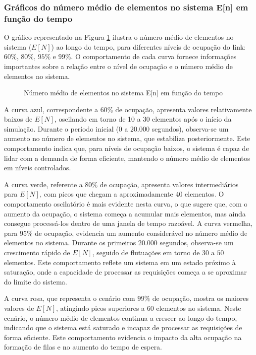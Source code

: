 \subsubsection{Gráficos do número médio de elementos no sistema E[n] em função do tempo}
O gráfico representado na Figura \ref{fig:eNE2} ilustra o número médio de elementos no sistema (\(E[N]\)) ao longo do tempo, para diferentes níveis de ocupação do link: \(60\%\), \(80\%\), \(95\%\) e \(99\%\). O comportamento de cada curva fornece informações importantes sobre a relação entre o nível de ocupação e o número médio de elementos no sistema.

\begin{figure}[h!]
   \centering
   
   \caption{Número médio de elementos no sistema E[n] em função do tempo}
   \label{fig:eNE2}
\end{figure}
A curva azul, correspondente a \(60\%\) de ocupação, apresenta valores relativamente baixos de \(E[N]\), oscilando em torno de 10 a 30 elementos após o início da simulação. Durante o período inicial (\(0\) a \(20.000\) segundos), observa-se um aumento no número de elementos no sistema, que estabiliza posteriormente. Este comportamento indica que, para níveis de ocupação baixos, o sistema é capaz de lidar com a demanda de forma eficiente, mantendo o número médio de elementos em níveis controlados.

A curva verde, referente a \(80\%\) de ocupação, apresenta valores intermediários para \(E[N]\), com picos que chegam a aproximadamente \(40\) elementos. O comportamento oscilatório é mais evidente nesta curva, o que sugere que, com o aumento da ocupação, o sistema começa a acumular mais elementos, mas ainda consegue processá-los dentro de uma janela de tempo razoável.
A curva vermelha, para \(95\%\) de ocupação, evidencia um aumento considerável no número médio de elementos no sistema. Durante os primeiros \(20.000\) segundos, observa-se um crescimento rápido de \(E[N]\), seguido de flutuações em torno de \(30\) a \(50\) elementos. Este comportamento reflete um sistema em um estado próximo à saturação, onde a capacidade de processar as requisições começa a se aproximar do limite do sistema.

A curva rosa, que representa o cenário com \(99\%\) de ocupação, mostra os maiores valores de \(E[N]\), atingindo picos superiores a \(60\) elementos no sistema. Neste cenário, o número médio de elementos continua a crescer ao longo do tempo, indicando que o sistema está saturado e incapaz de processar as requisições de forma eficiente. Este comportamento evidencia o impacto da alta ocupação na formação de filas e no aumento do tempo de espera.


